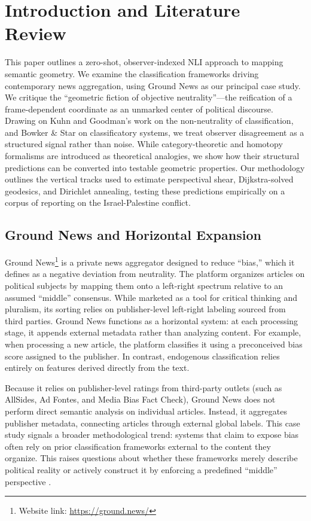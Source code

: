 \section{Introduction and Literature Review}

This paper outlines a zero-shot, observer-indexed NLI approach to mapping semantic geometry. We examine the classification frameworks driving contemporary news aggregation, using Ground News as our principal case study. We critique the ``geometric fiction of objective neutrality''---the reification of a frame-dependent coordinate as an unmarked center of political discourse. Drawing on Kuhn and Goodman's work on the non-neutrality of classification, and Bowker \& Star on classificatory systems, we treat observer disagreement as a structured signal rather than noise. While category-theoretic and homotopy formalisms are introduced as theoretical analogies, we show how their structural predictions can be converted into testable geometric properties. Our methodology outlines the vertical tracks used to estimate perspectival shear, Dijkstra-solved geodesics, and Dirichlet annealing, testing these predictions empirically on a corpus of reporting on the Israel-Palestine conflict.

\subsection{Ground News and Horizontal Expansion}

Ground News\footnote{Website link: \url{https://ground.news/}} is a private news aggregator designed to reduce ``bias,'' which it defines as a negative deviation from neutrality. The platform organizes articles on political subjects by mapping them onto a left-right spectrum relative to an assumed ``middle'' consensus. While marketed as a tool for critical thinking and pluralism, its sorting relies on publisher-level left-right labeling sourced from third parties. Ground News functions as a horizontal system: at each processing stage, it appends external metadata rather than analyzing content. For example, when processing a new article, the platform classifies it using a preconceived bias score assigned to the publisher. In contrast, endogenous classification relies entirely on features derived directly from the text.

Because it relies on publisher-level ratings from third-party outlets (such as AllSides, Ad Fontes, and Media Bias Fact Check), Ground News does not perform direct semantic analysis on individual articles. Instead, it aggregates publisher metadata, connecting articles through external global labels. This case study signals a broader methodological trend: systems that claim to expose bias often rely on prior classification frameworks external to the content they organize. This raises questions about whether these frameworks merely describe political reality or actively construct it by enforcing a predefined ``middle'' perspective \citep{bowkerstar1999}.

